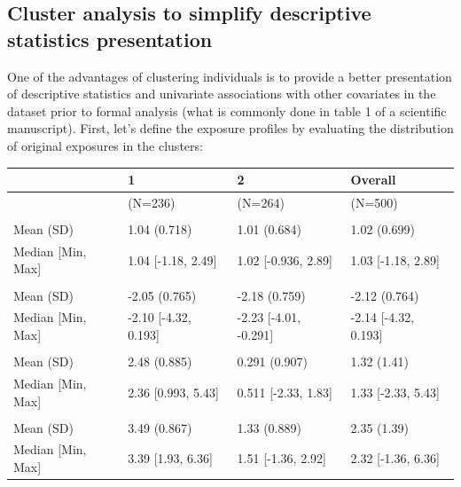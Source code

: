 \documentclass[
]{book}
\begin{document}
\hypertarget{cluster-analysis-to-simplify-descriptive-statistics-presentation}{%
\subsection{Cluster analysis to simplify descriptive statistics presentation}\label{cluster-analysis-to-simplify-descriptive-statistics-presentation}}

One of the advantages of clustering individuals is to provide a better presentation of descriptive statistics and univariate associations with other covariates in the dataset prior to formal analysis (what is commonly done in table 1 of a scientific manuscript). First, let's define the exposure profiles by evaluating the distribution of original exposures in the clusters:

\begin{tabular}[t]{llll}
\toprule
  & 1 & 2 & Overall\\
\midrule
 & (N=236) & (N=264) & (N=500)\\
\addlinespace[0.3em]
\multicolumn{4}{l}{\textbf{x1}}\\
\hspace{1em}Mean (SD) & 1.04 (0.718) & 1.01 (0.684) & 1.02 (0.699)\\
\hspace{1em}Median [Min, Max] & 1.04 [-1.18, 2.49] & 1.02 [-0.936, 2.89] & 1.03 [-1.18, 2.89]\\
\addlinespace[0.3em]
\multicolumn{4}{l}{\textbf{x2}}\\
\hspace{1em}Mean (SD) & -2.05 (0.765) & -2.18 (0.759) & -2.12 (0.764)\\
\hspace{1em}Median [Min, Max] & -2.10 [-4.32, 0.193] & -2.23 [-4.01, -0.291] & -2.14 [-4.32, 0.193]\\
\addlinespace[0.3em]
\multicolumn{4}{l}{\textbf{x3}}\\
\hspace{1em}Mean (SD) & 2.48 (0.885) & 0.291 (0.907) & 1.32 (1.41)\\
\hspace{1em}Median [Min, Max] & 2.36 [0.993, 5.43] & 0.511 [-2.33, 1.83] & 1.33 [-2.33, 5.43]\\
\addlinespace[0.3em]
\multicolumn{4}{l}{\textbf{x4}}\\
\hspace{1em}Mean (SD) & 3.49 (0.867) & 1.33 (0.889) & 2.35 (1.39)\\
\hspace{1em}Median [Min, Max] & 3.39 [1.93, 6.36] & 1.51 [-1.36, 2.92] & 2.32 [-1.36, 6.36]\\

\end{tabular}
\end{document}
